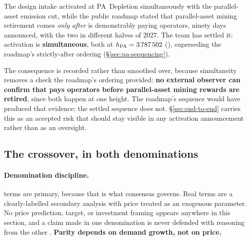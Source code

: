 
\begin{remark}
\label{rem:c1a-settled}
The design intake activated \PNR{} at PA~Depletion simultaneously with the parallel-asset emission
cut, while the public roadmap stated that parallel-asset mining retirement comes \emph{only after}
\PNR{} is demonstrably paying operators, ninety days announced, with the two in different halves of
2027. The team has settled it: activation is \textbf{simultaneous}, both at
$h_{\mathrm{PA}} = \num{3787502}$  (\planned), superseding the
roadmap's strictly-after ordering (\S\ref{sec:pa-sequencing}).

The consequence is recorded rather than smoothed over, because simultaneity removes a check the
roadmap's ordering provided: \textbf{no external observer can confirm that \PNR{} pays operators
before parallel-asset mining rewards are retired}, since both happen at one height. The roadmap's
sequence would have produced that evidence; the settled sequence does not. \S\ref{sec:end-to-end} carries
this as an accepted risk that should stay visible in any activation announcement rather than as an
oversight.
\end{remark}

\subsection{The crossover, in both denominations}
\label{sec:pnr:crossover}

\paragraph{Denomination discipline.} \flux terms are primary, because that is what consensus
governs. Real terms are a clearly-labelled secondary analysis with price treated as an exogenous
parameter. No price prediction, target, or investment framing appears anywhere in this section, and
a claim made in one denomination is never defended with reasoning from the other
. \textbf{Parity depends on demand growth, not on
price.}

